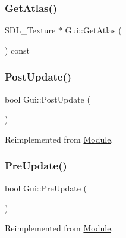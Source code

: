 \mbox{\label{class_gui_a950aff1c9c025edbf3b765ff77ec4c5d}} 
\subsubsection{\texorpdfstring{GetAtlas()}{GetAtlas()}}
{\footnotesize\ttfamily S\+D\+L\+\_\+\+Texture $\ast$ Gui\+::\+Get\+Atlas (\begin{DoxyParamCaption}{ }\end{DoxyParamCaption}) const}

\mbox{\label{class_gui_a49d5bf6fa118544dd5827f0412d5968d}} 
\subsubsection{\texorpdfstring{PostUpdate()}{PostUpdate()}}
{\footnotesize\ttfamily bool Gui\+::\+Post\+Update (\begin{DoxyParamCaption}{ }\end{DoxyParamCaption})\hspace{0.3cm}{\ttfamily [virtual]}}



Reimplemented from \mbox{\hyperlink{class_module_afc355df351a4483850c3f512823ceebd}{Module}}.

\mbox{\label{class_gui_a0909298219825317830f462bec002d5b}} 
\subsubsection{\texorpdfstring{PreUpdate()}{PreUpdate()}}
{\footnotesize\ttfamily bool Gui\+::\+Pre\+Update (\begin{DoxyParamCaption}{ }\end{DoxyParamCaption})\hspace{0.3cm}{\ttfamily [virtual]}}



Reimplemented from \mbox{\hyperlink{class_module_a2c64af5917825500cf6f0497258bc398}{Module}}.

\mbox{\label{class_gui_ab62e1b47c26df1e5a69932becb0cc1de}} 

